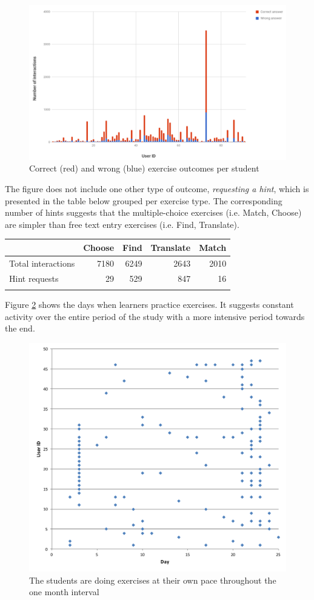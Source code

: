   \begin{figure}[h!]
  \centering
    \includegraphics[width=\columnwidth]{figures/exercise_interactions_count.png}
    \caption{Correct (red) and wrong (blue) exercise outcomes per student}
    \label{fig:ex_interactions}
  \end{figure}

The figure does not include one other type of outcome, {\em requesting a hint}, which is presented in the table below grouped per exercise type. The corresponding number of hints suggests that the multiple-choice exercises (i.e. Match, Choose) are simpler than free text entry exercises (i.e. Find, Translate).

\begin{tabular}{lrrrr}
                      & Choose  & Find & Translate & Match \\ \hline
  Total interactions  & 7180    & 6249 & 2643      & 2010\\
  Hint requests       & 29      & 529  & 847       & 16 \\ \hline
  \label{tab:hints_per_ex_type}
\end{tabular}

Figure \ref{fig:activity_per_day} shows the days when learners practice exercises. It suggests constant activity over the entire period of the study with a more intensive period towards the end.

  \begin{figure}[h!]
  \centering
    \includegraphics[width=0.8\columnwidth]{figures/user_exercise_activity_vs_day.pdf}
    \caption{The students are doing exercises at their own pace throughout the one month interval }
    \label{fig:activity_per_day}
  \end{figure}




